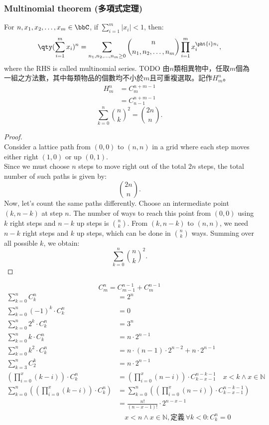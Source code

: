 \documentclass[a4paper,12pt]{report}
\begin{document}
\subsubsection{Multinomial theorem (多項式定理)}
For $n,x_1,x_2,\ldots,x_m\in\bbC$, if $\sum_{i=1}^m|x_i|<1$, then:
\[\qty(\sum_{i=1}^mx_i)^n=\sum_{n_1,n_2,\ldots,n_m\ge 0}\binom{n}{n_1,n_2,\ldots,n_m}\prod_{i=1}^mx_i^{\pht{i}n_i},\]
where the RHS is called multinomial series.
\bpr
TODO
\epr
{}
由$n$類相異物中，任取$m$個為一組之方法數，其中每類物品的個數均不小於$m$且可重複選取。記作$H^n_m$。
\[
\begin{aligned}
H_m^n &= C^{n+m-1}_m \\
&= C^{n+m-1}_{n-1}
\end{aligned}
\]
\[\sum_{k=0}^n\binom{n}{k}^2=\binom{2n}{n}.\]
\begin{proof}\mbox{}\\
Consider a lattice path from \((0,0)\) to \((n,n)\) in a grid where each step moves either right \((1,0)\) or up \((0,1)\).\\
Since we must choose \( n \) steps to move right out of the total \( 2n \) steps, the total number of such paths is given by:
\[\binom{2n}{n}.\]
Now, let’s count the same paths differently. Choose an intermediate point \((k, n-k)\) at step \( n \). The number of ways to reach this point from \((0,0)\) using \( k \) right steps and \( n-k \) up steps is \( \binom{n}{k} \). From \((k, n-k)\) to \((n,n)\), we need \( n-k \) right steps and \( k \) up steps, which can be done in \( \binom{n}{k} \) ways. Summing over all possible \( k \), we obtain:
\[\sum_{k=0}^{n}\binom{n}{k}^2.\]
\end{proof}
\[C^n_m=C^{n-1}_{m-1}+C^{n-1}_m\]
\[
\begin{aligned}
\sum_{k=0}^n C_k^n &= 2^n \\
\sum_{k=0}^n (-1)^k \cdot C_k^n &= 0 \\
\sum_{k=0}^n 2^k \cdot C_k^n &= 3^n \\
\sum_{k=0}^n k \cdot C_k^n &= n \cdot 2^{n-1} \\
\sum_{k=0}^n k^2 \cdot C_k^n &= n \cdot (n-1) \cdot 2^{n-2} + n \cdot 2^{n-1} \\
\sum_{k=3}^n C_2^k &= n \cdot 2^{n-1} \\
\left(\prod_{i=0}^x (k-i)\right) \cdot C^n_k &= \left(\prod_{i=0}^x (n-i)\right) \cdot C^{n-k-1}_{k-x-1} \quad x < k\land x \in \mathbb{N} \\
\sum_{k=0}^{n} \left(\left(\prod_{i=0}^x (k-i)\right) \cdot C^n_k\right) &= \sum_{k=0}^{n} \left(\left(\prod_{i=0}^x (n-i)\right) \cdot C^{n-k-1}_{k-x-1}\right) \\
&= \frac{n!}{\left(n-x-1\right)!} \cdot 2^{n-x-1} \\
& \quad x < n\land x \in \mathbb{N}, \text{定義}\,\forall k<0: C_k^n=0
\end{aligned}
\]
\end{document}
